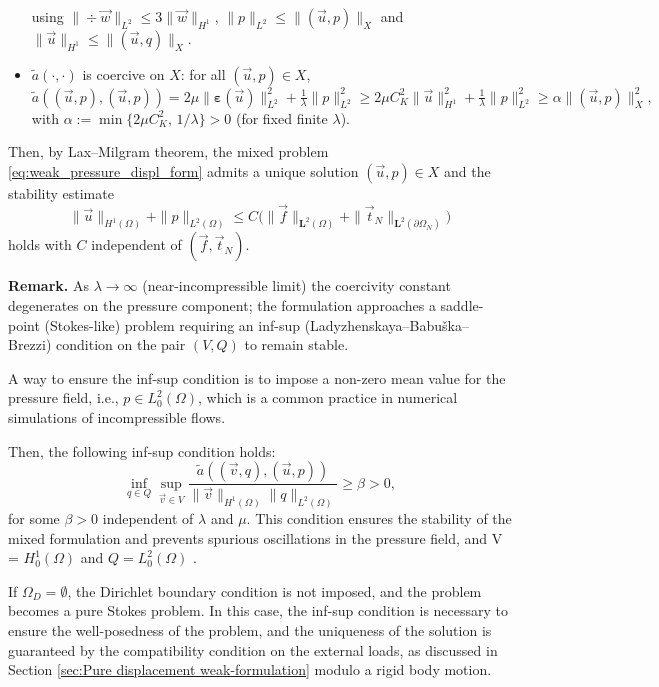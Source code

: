 \documentclass[a4paper,12pt,twoside]{report}
\begin{document}
\begin{itemize}
	using $\|\div \vec w\|_{L^2}\le 3 \|\vec w\|_{H^1}$, $\|p\|_{L^2} \le \|(\vec u,p)\|_X$ and $\|\vec u\|_{H^1} \le \|(\vec u,q)\|_X$.
	\item $\tilde a(\cdot,\cdot)$ is coercive on $X$: for all $(\vec u,p)\in X$,
	\begin{equation*}
		\tilde a((\vec u,p),(\vec u,p)) = 2\mu \|\boldsymbol{\varepsilon}(\vec u)\|_{L^2}^2 + \tfrac{1}{\lambda}\|p\|_{L^2}^2
		\ge 2\mu C_K^2 \|\vec u\|_{H^1}^2 + \tfrac{1}{\lambda}\|p\|_{L^2}^2
		\ge \alpha \|(\vec u,p)\|_X^2,
	\end{equation*}
	with $\alpha:=\min\{2\mu C_K^2,\,1/\lambda\}>0$ (for fixed finite $\lambda$).
\end{itemize}

Then, by Lax–Milgram theorem, the mixed problem \eqref{eq:weak_pressure_displ_form} admits a unique solution $(\vec u,p)\in X$ and the stability estimate
\[
\|\vec u\|_{H^1(\Omega)}+\|p\|_{L^2(\Omega)} \le C\big(\|\vec f\|_{\boldsymbol L^2(\Omega)} + \|\vec t_N\|_{\boldsymbol L^2(\partial\Omega_N)}\big)
\]
holds with $C$ independent of $(\vec f,\vec t_N)$.

\noindent \textbf{Remark.} As $\lambda\to \infty$ (near-incompressible limit) the coercivity constant degenerates on the pressure component; the formulation approaches a saddle-point (Stokes-like) problem requiring an inf-sup (Ladyzhenskaya–Babuška–Brezzi) condition on the pair $(V,Q)$ to remain stable.

A way to ensure the inf-sup condition is to impose a non-zero mean value for the pressure field, i.e., $p\in L^2_0(\Omega)$, which is a common practice in numerical simulations of incompressible flows.

Then, the following inf-sup condition holds:
\[\inf_{q\in Q}\sup_{\vec v\in V}\frac{\tilde a((\vec v,q),(\vec u,p))}{\|\vec v\|_{H^1(\Omega)}\|q\|_{L^2(\Omega)}} \ge \beta > 0,\]
for some $\beta>0$ independent of $\lambda$ and $\mu$. This condition ensures the stability of the mixed formulation and prevents spurious oscillations in the pressure field, and V = $H^1_0(\Omega)$ and $Q = L^2_0(\Omega)$ \cite{boffi_mixed_2008}.

If $\Omega_D = \emptyset$, the Dirichlet boundary condition is not imposed, and the problem becomes a pure Stokes problem. In this case, the inf-sup condition is necessary to ensure the well-posedness of the problem, and the uniqueness of the solution is guaranteed by the compatibility condition on the external loads, as discussed in Section \ref{sec:Pure displacement weak-formulation} modulo a rigid body motion.
\end{document}

